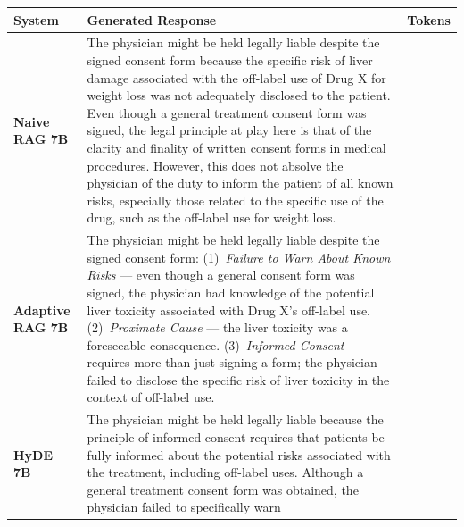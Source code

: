 \documentclass[a4paper,fleql]{cas-sc}
\begin{document}
\clearpage
\vspace{6pt plus 4pt minus 3pt}
\begin{center}
\begingroup
{}
\label{tab:casestudy_comparison}
\renewcommand{\arraystretch}{1.4}
\footnotesize
\begin{tabular}{m{2.3cm} | m{10.0cm} | >{\centering\arraybackslash}m{1.5cm}}
\toprule
\textbf{System} & \textbf{Generated Response} & \textbf{Tokens} \\
\midrule
\textbf{Naive RAG 7B}
& The physician might be held legally liable despite the signed consent form
because the specific risk of liver damage associated with the off-label use of
Drug X for weight loss was not adequately disclosed to the patient. Even though
a general treatment consent form was signed, the legal principle at play here
is that of the clarity and finality of written consent forms in medical
procedures. However, this does not absolve the physician of the duty to inform
the patient of all known risks, especially those related to the specific use of
the drug, such as the off-label use for weight loss. & 102 \\
\midrule
\textbf{Adaptive RAG 7B}
& The physician might be held legally liable despite the signed consent form:
(1)~\textit{Failure to Warn About Known Risks} --- even though a general
consent form was signed, the physician had knowledge of the potential liver
toxicity associated with Drug X's off-label use.
(2)~\textit{Proximate Cause} --- the liver toxicity was a foreseeable
consequence.
(3)~\textit{Informed Consent} --- requires more than just signing a form; the
physician failed to disclose the specific risk of liver toxicity in the context
of off-label use. & 89 \\
\midrule
\textbf{HyDE 7B}
& The physician might be held legally liable because the principle of informed
consent requires that patients be fully informed about the potential risks
associated with the treatment, including off-label uses. Although a general
treatment consent form was obtained, the physician failed to specifically warn

\end{tabular}
\end{center}
\end{document}

